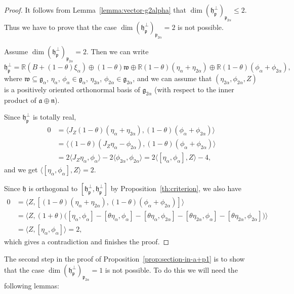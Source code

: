 \documentclass[12pt, a4paper]{amsart}
\newcommand{\g}{\mathfrak}
\newcommand{\R}{\mathbb{R}}
\theoremstyle{definition}
\begin{document}
\begin{proof}
It follows from Lemma~\ref{lemma:vector-g2alpha} that $\dim(\g{h}_{\g{p}}^\perp)_{\g{p}_{2\alpha}}\leq 2$.
Thus we have to prove that the case $\dim(\g{h}_{\g{p}}^\perp)_{\g{p}_{2\alpha}}= 2$ is not possible.

Assume $\dim(\g{h}_{\g{p}}^\perp)_{\g{p}_{2\alpha}}= 2$.
Then we can write
\[
\g{h}_{\g{p}}^\perp=\R(B+(1-\theta)\xi_\alpha)\oplus(1-\theta)\g{w}\oplus\R(1-\theta)(\eta_\alpha+\eta_{2\alpha})
\oplus\R(1-\theta)(\phi_\alpha+\phi_{2\alpha}),
\]
where $\g{w}\subseteq\g{g}_\alpha$, $\eta_\alpha$, $\phi_\alpha\in\g{g}_\alpha$, $\eta_{2\alpha}$, $\phi_{2\alpha}\in\g{g}_{2\alpha}$, and we can assume that $(\eta_{2\alpha},\phi_{2\alpha},Z)$ is a positively oriented orthonormal basis of $\g{g}_{2\alpha}$ (with respect to the inner product of $\g{a}\oplus\g{n}$).

Since $\g{h}_{\g{p}}^\perp$ is totally real,
\begin{align*}
0
&{}=\langle J_Z(1-\theta)(\eta_\alpha+\eta_{2\alpha}),(1-\theta)(\phi_\alpha+\phi_{2\alpha})\rangle\\
&{}=\langle (1-\theta)(J_Z \eta_\alpha-\phi_{2\alpha}),(1-\theta)(\phi_\alpha+\phi_{2\alpha})\rangle\\
&{}=2\langle J_Z\eta_\alpha,\phi_\alpha\rangle-2\langle\phi_{2\alpha},\phi_{2\alpha}\rangle
=2\langle [\eta_\alpha,\phi_\alpha],Z\rangle-4,
\end{align*}
and we get $\langle [\eta_\alpha,\phi_\alpha],Z\rangle=2$.

Since $\g{h}$ is orthogonal to $[\g{h}_{\g{p}}^\perp,\g{h}_{\g{p}}^\perp]$ by Proposition~\ref{th:criterion},
we also have
\begin{align*}
0
&{}=\langle Z,[(1-\theta)(\eta_\alpha+\eta_{2\alpha}),(1-\theta)(\phi_\alpha+\phi_{2\alpha})]\rangle\\
&{}=\bigl\langle Z,(1+\theta)\bigl([\eta_\alpha,\phi_\alpha]-[\theta\eta_\alpha,\phi_\alpha]
-[\theta\eta_\alpha,\phi_{2\alpha}]-[\theta\eta_{2\alpha},\phi_\alpha]
-[\theta\eta_{2\alpha},\phi_{2\alpha}]\bigr)\bigr\rangle\\
&{}=\langle Z,[\eta_\alpha,\phi_\alpha]\rangle=2,
\end{align*}
which gives a contradiction and finishes the proof.
\end{proof}

The second step in the proof of Proposition~\ref{prop:section-in-a+p1}
is to show that the case $\dim(\g{h}_{\g{p}}^\perp)_{\g{p}_{2\alpha}}= 1$ is not possible.
To do this we will need the following lemmas:
\end{document}

